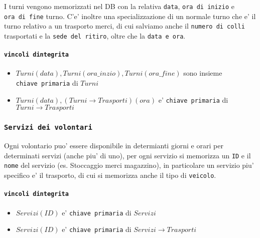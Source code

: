 \documentclass[]{article}
\providecommand{\tightlist}{%
  \setlength{\itemsep}{0pt}\setlength{\parskip}{0pt}}
\let\oldparagraph\paragraph
\renewcommand{\paragraph}[1]{\oldparagraph{#1}\mbox{}}
\begin{document}
I turni vengono memorizzati nel DB con la relativa \texttt{data},
\texttt{ora\ di\ inizio} e \texttt{ora\ di\ fine} turno. C'e' inoltre
una specializzazione di un normale turno che e' il turno relativo a un
trasporto merci, di cui salviamo anche il \texttt{numero\ di\ colli}
trasportati e la \texttt{sede\ del\ ritiro}, oltre che la
\texttt{data\ e\ ora}.

\hypertarget{vincoli-dintegrita-5}{%
\paragraph{\texorpdfstring{\texttt{vincoli\ d\textquotesingle{}integrita\textquotesingle{}}}{vincoli d'integrita'}}\label{vincoli-dintegrita-5}}

\begin{itemize}
\tightlist
\item
  \(Turni(data), Turni(ora\_inzio), Turni(ora\_fine)\) sono insieme
  \texttt{chiave\ primaria} di \(Turni\)
\item
  \(Turni(data), (Turni \to Trasporti)(ora)\) e'
  \texttt{chiave\ primaria} di \(Turni \to Trasporti\)
\end{itemize}

\hypertarget{servizi-dei-volontari}{%
\subsubsection{\texorpdfstring{\texttt{Servizi\ dei\ volontari}}{Servizi dei volontari}}\label{servizi-dei-volontari}}

Ogni volontario puo' essere disponibile in determianti giorni e orari
per determinati servizi (anche piu' di uno), per ogni servizio si
memorizza un \texttt{ID} e il \texttt{nome} del servizio (es. Stoccaggio
merci magazzino), in particolare un servizio piu' specifico e' il
trasporto, di cui si memorizza anche il tipo di \texttt{veicolo}.

\hypertarget{vincoli-dintegrita-6}{%
\paragraph{\texorpdfstring{\texttt{vincoli\ d\textquotesingle{}integrita\textquotesingle{}}}{vincoli d'integrita'}}\label{vincoli-dintegrita-6}}

\begin{itemize}
\tightlist
\item
  \(Servizi(ID)\) e' \texttt{chiave\ primaria} di \(Servizi\)
\item
  \(Servizi(ID)\) e' \texttt{chiave\ primaria} di
  \(Servizi \to Trasporti\)
\end{itemize}
\end{document}
